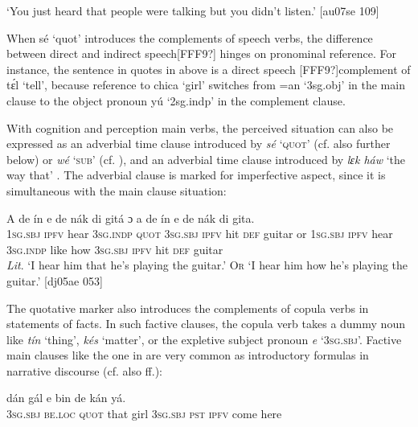 \glt ‘You just heard that people were talking but you didn’t listen.’ [au07se 109]
\z

When sé ‘quot’ introduces the complements of speech verbs, the difference between direct and indirect speech[FFF9?] hinges on pronominal reference. For instance, the sentence in quotes in  above is a direct speech [FFF9?]complement of tɛ́l ‘tell’, because reference to chica ‘girl’ switches from =an ‘3sg.obj’ in the main clause to the object pronoun yú ‘2sg.indp’ in the complement clause.


With cognition and perception main verbs, the perceived situation can also be expressed as an adverbial time clause introduced by \textit{sé} ‘\textsc{quot}’  (cf. also  further below) or \textit{wé} ‘\textsc{sub}’ (cf. ), and an adverbial time clause introduced by \textit{lɛk háw} ‘the way that’ . The adverbial clause is marked for imperfective aspect, since it is simultaneous with the main clause situation: 



\ea%
    \label{ex:key:1408}
    \gll \MakeUppercase{A}   de      ín        e    de  nák  di  gitá    ɔ 
a    de      ín          e    de  nák  di  gita. \\
\textsc{1sg.sbj}  \textsc{ipfv}  hear    \textsc{3sg.indp}  \textsc{quot}    \textsc{3sg.sbj}  \textsc{ipfv} hit  \textsc{def}  guitar  or
\textsc{1sg.sbj}  \textsc{ipfv}  hear    \textsc{3sg.indp}  like  how    \textsc{3sg.sbj}  \textsc{ipfv} hit  \textsc{def}  guitar\\

\glt 
\textit{Lit}. ‘I hear him that he’s playing the guitar.’ \textsc{Or} ‘I hear him how he’s playing 
the guitar.’ [dj05ae 053]
\z

The quotative marker also introduces the complements of copula verbs in statements of facts. In such factive clauses, the copula verb takes a dummy noun like \textit{tín} ‘thing’, \textit{kés} ‘matter’, or the expletive subject pronoun \textit{e} ‘\textsc{3sg.sbj}’. Factive main clauses like the one in  are very common as introductory formulas in narrative discourse (cf. also ff.): 


\ea%
    \label{ex:key:1409}
    \gll {}            dán    gál    e    bin  de  kán    yá.\\
\textsc{3sg.sbj}  \textsc{be.loc}  \textsc{quot}    that    girl    \textsc{3sg.sbj}  \textsc{pst}  \textsc{ipfv}  come  here\\

